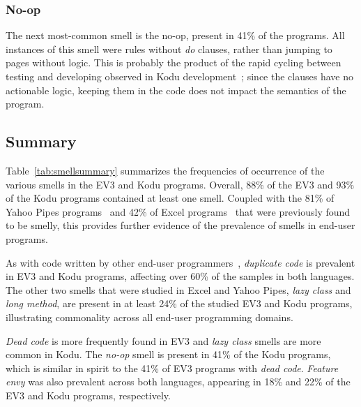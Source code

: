\documentclass{sig-alternate}
\begin{document}
\subsubsection{No-op}
The next most-common smell is the no-op, present in 41\% of the programs. All instances of this smell were rules without \emph{do} clauses, rather than jumping to pages without logic. This is probably the product of the rapid cycling between testing and developing observed in Kodu development~\cite{Stolee:2011:ECS:1953163.1953197}; since the clauses have no actionable logic, keeping them in the code does not impact the semantics of the program. 

\subsection{Summary}
Table~\ref{tab:smellsummary} summarizes the frequencies of occurrence of the various smells in the EV3 and Kodu programs. Overall, 88\% of the EV3 and 93\% of the Kodu programs contained at least one smell. Coupled with the 81\% of Yahoo Pipes programs~\cite{StoleeTSE2013} and 42\% of Excel programs~\cite{Hermans2012intra} that were previously found to be smelly, this provides further evidence of the prevalence of smells in end-user programs. 

As with code written by other end-user programmers~\cite{StoleeTSE2013}, \emph{duplicate code} is prevalent in EV3 and Kodu programs, affecting over 60\% of the samples in both languages. The other two smells that were studied in Excel and Yahoo Pipes, \emph{lazy class} and \emph{long method}, are present in at least 24\% of the studied EV3 and Kodu programs, illustrating commonality across all end-user programming domains. 

\emph{Dead code} is more frequently found in EV3 and \emph{lazy class} smells are more common in Kodu. The \emph{no-op} smell is present in 41\% of the Kodu programs, which is similar in spirit to the 41\% of EV3 programs with \emph{dead code}. \emph{Feature envy} was also prevalent across both languages, appearing in 18\% and 22\% of the EV3 and Kodu programs, respectively. 
\end{document}
